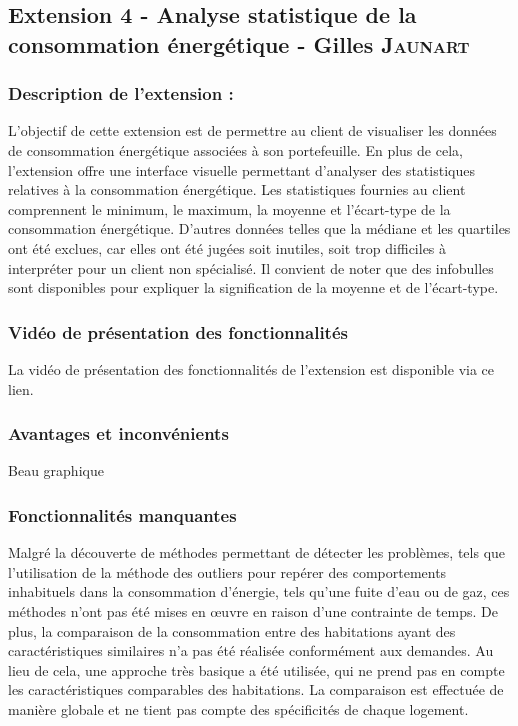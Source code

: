 \documentclass[../rapport.tex]{subfiles}
\begin{document}
\subsection{Extension 4 - Analyse statistique de la consommation énergétique - Gilles \textsc{Jaunart}}

\subsubsection{Description de l'extension :}

L'objectif de cette extension est de permettre au client de visualiser les données de consommation énergétique associées à son portefeuille. En plus de cela, l'extension offre une interface visuelle permettant d'analyser des statistiques relatives à la consommation énergétique. 
Les statistiques fournies au client comprennent le minimum, le maximum, la moyenne et l'écart-type de la consommation énergétique. D'autres données telles que la médiane et les quartiles ont été exclues, car elles ont été jugées soit inutiles, soit trop difficiles à interpréter pour un client non spécialisé. Il convient de noter que des infobulles sont disponibles pour expliquer la signification de la moyenne et de l'écart-type. 

\subsubsection{Vidéo de présentation des fonctionnalités} 
La vidéo de présentation des fonctionnalités de l'extension est disponible via ce lien.

\subsubsection{Avantages et inconvénients} 
Beau graphique

\subsubsection{Fonctionnalités manquantes} 

Malgré la découverte de méthodes permettant de détecter les problèmes, tels que l'utilisation de la méthode des outliers pour repérer des comportements inhabituels dans la consommation d'énergie, tels qu'une fuite d'eau ou de gaz, ces méthodes n'ont pas été mises en œuvre en raison d'une contrainte de temps. 
De plus, la comparaison de la consommation entre des habitations ayant des caractéristiques similaires n'a pas été réalisée conformément aux demandes. Au lieu de cela, une approche très basique a été utilisée, qui ne prend pas en compte les caractéristiques comparables des habitations. La comparaison est effectuée de manière globale et ne tient pas compte des spécificités de chaque logement.
\end{document}
